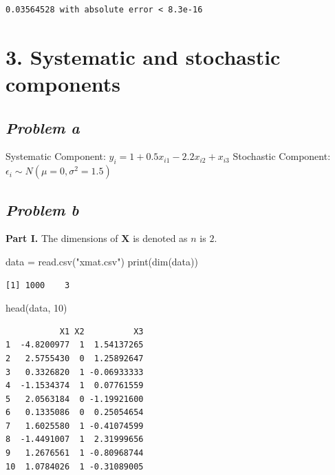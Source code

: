 \documentclass[
  letterpaper,
  DIV=11,
  numbers=noendperiod]{scrartcl}
\newenvironment{Shaded}{\begin{snugshade}}{\end{snugshade}}
\newcommand{\DecValTok}[1]{\textcolor[rgb]{0.68,0.00,0.00}{#1}}
\newcommand{\FunctionTok}[1]{\textcolor[rgb]{0.28,0.35,0.67}{#1}}
\newcommand{\NormalTok}[1]{\textcolor[rgb]{0.00,0.23,0.31}{#1}}
\newcommand{\OtherTok}[1]{\textcolor[rgb]{0.00,0.23,0.31}{#1}}
\newcommand{\StringTok}[1]{\textcolor[rgb]{0.13,0.47,0.30}{#1}}
\begin{document}
\begin{verbatim}
0.03564528 with absolute error < 8.3e-16
\end{verbatim}

\section{3. Systematic and stochastic
components}\label{systematic-and-stochastic-components}

\subsection{\texorpdfstring{\emph{Problem
a}}{Problem a}}\label{problem-a-1}

Systematic Component: \(y_i=1+0.5x_{i1}-2.2x_{i2}+x_{i3}\) Stochastic
Component: \({\epsilon_i}\sim{N(\mu=0,\sigma^2=1.5)}\)

\subsection{\texorpdfstring{\emph{Problem
b}}{Problem b}}\label{problem-b-1}

\textbf{Part I.} The dimensions of \(\mathbf{X}\) is denoted as \(n\) is
\(2\).

\begin{Shaded}
\begin{Highlighting}[]
\NormalTok{data }\OtherTok{=} \FunctionTok{read.csv}\NormalTok{(}\StringTok{"xmat.csv"}\NormalTok{)}
\FunctionTok{print}\NormalTok{(}\FunctionTok{dim}\NormalTok{(data))}
\end{Highlighting}
\end{Shaded}

\begin{verbatim}
[1] 1000    3
\end{verbatim}

\begin{Shaded}
\begin{Highlighting}[]
\FunctionTok{head}\NormalTok{(data, }\DecValTok{10}\NormalTok{)}
\end{Highlighting}
\end{Shaded}

\begin{verbatim}
           X1 X2          X3
1  -4.8200977  1  1.54137265
2   2.5755430  0  1.25892647
3   0.3326820  1 -0.06933333
4  -1.1534374  1  0.07761559
5   2.0563184  0 -1.19921600
6   0.1335086  0  0.25054654
7   1.6025580  1 -0.41074599
8  -1.4491007  1  2.31999656
9   1.2676561  1 -0.80968744
10  1.0784026  1 -0.31089005
\end{verbatim}
\end{document}
